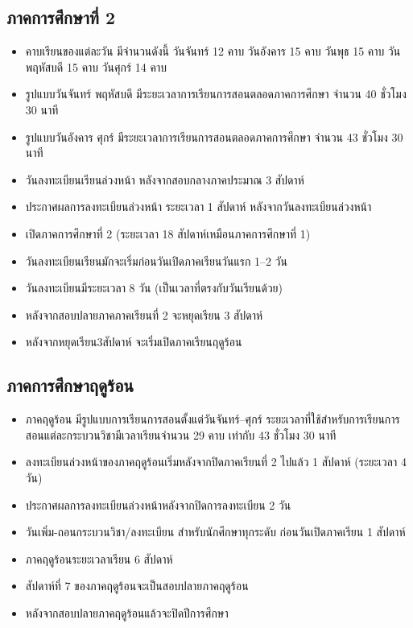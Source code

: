   

\subsection{ภาคการศึกษาที่ 2}
\begin{itemize}
  \item คาบเรียนของแต่ละวัน มีจำนวนดังนี้ วันจันทร์ 12 คาบ วันอังคาร 15 คาบ วันพุธ 15 คาบ วันพฤหัสบดี 15 คาบ วันศุกร์ 14 คาบ
  \item รูปแบบวันจันทร์ พฤหัสบดี มีระยะเวลาการเรียนการสอนตลอดภาคการศึกษา จำนวน 40 ชั่วโมง 30 นาที
  \item รูปแบบวันอังคาร ศุกร์ มีระยะเวลาการเรียนการสอนตลอดภาคการศึกษา จำนวน 43 ชั่วโมง 30 นาที
  \item วันลงทะเบียนเรียนล่วงหน้า หลังจากสอบกลางภาคประมาณ 3 สัปดาห์
  \item ประกาศผลการลงทะเบียนล่วงหน้า ระยะเวลา 1 สัปดาห์ หลังจากวันลงทะเบียนล่วงหน้า 
  \item เปิดภาคการศึกษาที่ 2 (ระยะเวลา 18 สัปดาห์เหมือนภาคการศึกษาที่ 1)
  \item วันลงทะเบียนเรียนมักจะเริ่มก่อนวันเปิดภาคเรียนวันแรก 1--2 วัน
  \item วันลงทะเบียนมีระยะเวลา 8 วัน (เป็นเวลาที่ตรงกับวันเรียนด้วย)
  \item หลังจากสอบปลายภาคภาคเรียนที่ 2 จะหยุดเรียน 3 สัปดาห์
  \item หลังจากหยุดเรียน3สัปดาห์ จะเริ่มเปิดภาคเรียนฤดูร้อน
\end{itemize}

\subsection{ภาคการศึกษาฤดูร้อน}
\begin{itemize}
  \item ภาคฤดูร้อน มีรูปแบบการเรียนการสอนตั้งแต่วันจันทร์--ศุกร์ ระยะเวลาที่ใช้สำหรับการเรียนการสอนแต่ละกระบวนวิชามีเวลาเรียนจำนวน 29 คาบ เท่ากับ 43 ชั่วโมง 30 นาที
  \item ลงทะเบียนล่วงหน้าของภาคฤดูร้อนเริ่มหลังจากปิดภาคเรียนที่ 2 ไปแล้ว 1 สัปดาห์ (ระยะเวลา 4 วัน)
  \item ประกาศผลการลงทะเบียนล่วงหน้าหลังจากปิดการลงทะเบียน 2 วัน
  \item วันเพิ่ม-ถอนกระบวนวิชา/ลงทะเบียน สำหรับนักศึกษาทุกระดับ ก่อนวันเปิดภาคเรียน 1 สัปดาห์
  \item ภาคฤดูร้อนระยะเวลาเรียน 6 สัปดาห์
  \item สัปดาห์ที่ 7 ของภาคฤดูร้อนจะเป็นสอบปลายภาคฤดูร้อน
  \item หลังจากสอบปลายภาคฤดูร้อนแล้วจะปิดปีการศึกษา
\end{itemize}



